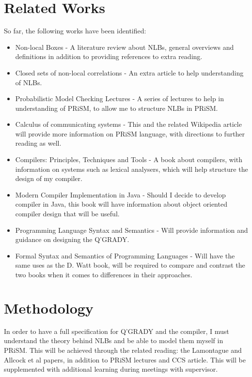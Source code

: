 \documentclass[11pt, a4paper]{article}
\begin{document}
\section{Related Works} %
\label{sec:related_works}
So far, the following works have been identified:
\begin{itemize}
    \item Non-local Boxes \cite{nlb_lamontague} - A literature review about
    NLBs, general overviews and definitions in addition to providing references
    to extra reading.
    \item Closed sets of non-local correlations
    \cite{Jonathan-Allcock:2009pd} - An extra article to help understanding
    of NLBs.
    \item Probabilistic Model Checking Lectures \cite{prism_lectures} - A
    series of lectures to help in understanding of PRiSM, to allow me to
    structure NLBs in PRiSM.
    \item Calculus of communicating systems \cite{ccs} - This and the related
    Wikipedia article will provide more information on PRiSM language, with
    directions to further reading as well. 
    \item Compilers: Principles, Techniques and Tools
    \cite{dragon_compiler} - A book about compilers, with information on
    systems such as lexical analysers, which will help structure the design of
    my compiler.
    \item Modern Compiler Implementation in Java \cite{java_compiler} -
    Should I decide to develop compiler in Java, this book will have information
    about object oriented compiler design that will be useful.
    \item Programming Language Syntax and Semantics \cite{plss} - Will
    provide information and guidance on designing the Q'GRADY.
    \item Formal Syntax and Semantics of Programming Languages \cite{fsspl}
    - Will have the same uses as the D. Watt book, will be required to compare
    and contrast the two books when it comes to differences in their approaches.
\end{itemize}


\section{Methodology} %
\label{sec:methodology}
In order to have a full specification for Q'GRADY and the compiler, I must 
understand the theory behind NLBs and be able to model them myself in PRiSM.
This will be achieved through the related reading: the Lamontague and Allcock et
al papers, in addition to PRiSM lectures and CCS article. This will be
supplemented with additional learning during meetings with supervisor.
\end{document}
